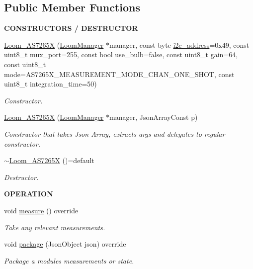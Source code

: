 \subsection*{Public Member Functions}
\begin{Indent}{\bf C\+O\+N\+S\+T\+R\+U\+C\+T\+O\+RS / D\+E\+S\+T\+R\+U\+C\+T\+OR}\par
\begin{DoxyCompactItemize}
\item 
\hyperlink{class_loom___a_s7265_x_abba5f26f08698ae2cb8e155db12bdec0}{Loom\+\_\+\+A\+S7265X} (\hyperlink{class_loom_manager}{Loom\+Manager} $\ast$manager, const byte \hyperlink{class_loom_i2_c_sensor_a6ff389c1f015152a9ebfccb037d3d90e}{i2c\+\_\+address}=0x49, const uint8\+\_\+t mux\+\_\+port=255, const bool use\+\_\+bulb=false, const uint8\+\_\+t gain=64, const uint8\+\_\+t mode=\+A\+S7265\+X\+\_\+\+M\+E\+A\+S\+U\+R\+E\+M\+E\+N\+T\+\_\+\+M\+O\+D\+E\+\_\+C\+H\+A\+N\+\_\+\+O\+N\+E\+\_\+\+S\+H\+O\+T, const uint8\+\_\+t integration\+\_\+time=50)
\begin{DoxyCompactList}\small\item\em Constructor. \end{DoxyCompactList}\item 
\hyperlink{class_loom___a_s7265_x_a89fe71b0299dbf065551014c9a9e2032}{Loom\+\_\+\+A\+S7265X} (\hyperlink{class_loom_manager}{Loom\+Manager} $\ast$manager, Json\+Array\+Const p)
\begin{DoxyCompactList}\small\item\em Constructor that takes Json Array, extracts args and delegates to regular constructor. \end{DoxyCompactList}\item 
\hyperlink{class_loom___a_s7265_x_a8cbca9f7f1b423fe7c70a5df4b175389}{$\sim$\+Loom\+\_\+\+A\+S7265X} ()=default
\begin{DoxyCompactList}\small\item\em Destructor. \end{DoxyCompactList}\end{DoxyCompactItemize}
\end{Indent}
\begin{Indent}{\bf O\+P\+E\+R\+A\+T\+I\+ON}\par
\begin{DoxyCompactItemize}
\item 
void \hyperlink{class_loom___a_s7265_x_a070af4692fd32d11aed32069d31c8a1e}{measure} () override
\begin{DoxyCompactList}\small\item\em Take any relevant measurements. \end{DoxyCompactList}\item 
void \hyperlink{class_loom___a_s7265_x_aa6b4502c7486d9aef3277af7287218f0}{package} (Json\+Object json) override
\begin{DoxyCompactList}\small\item\em Package a modules measurements or state. \end{DoxyCompactList}\end{DoxyCompactItemize}
\end{Indent}
